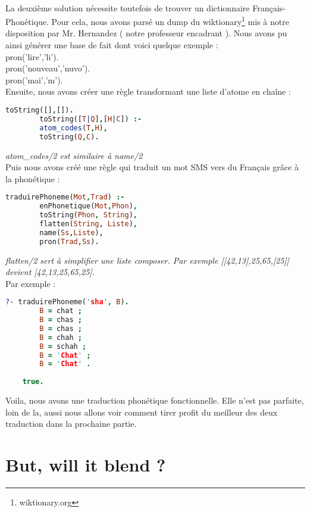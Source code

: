 \documentclass[11pt]{book}
\begin{document}
	\paragraph{}
	La deuxième solution nécessite toutefois de trouver un dictionnaire Français-Phonétique. Pour cela, nous avons parsé un dump du wiktionary\footnote{wiktionary.org} mis à notre disposition par Mr. Hernandez ( notre professeur encadrant ).
	Nous avons pu ainsi générer une base de fait dont voici quelque exemple :\\
	
	\indent pron('lire','li').\\
	\indent pron('nouveau','nuvo').\\
	\indent pron('mai','m').\\
	
	Ensuite, nous avons créer une règle transformant une liste d'atome en chaîne :
	\begin{lstlisting}[language=Prolog]
	toString([],[]).
		toString([T|Q],[H|C]) :-
		atom_codes(T,H),
		toString(Q,C).
	\end{lstlisting}
	
	{\em atom\_codes/2 est similaire à name/2}\\
	
	Puis nous avons créé une règle qui traduit un mot SMS vers du Français grâce à la phonétique :
	\begin{lstlisting}[language=Prolog]
	traduirePhoneme(Mot,Trad) :-
		enPhonetique(Mot,Phon),
		toString(Phon, String),
		flatten(String, Liste),
		name(Ss,Liste),
		pron(Trad,Ss).
	\end{lstlisting}
	
	{\em flatten/2 sert à simplifier une liste composer. Par exemple [[42,13],25,65,[25]] devient [42,13,25,65,25].}\\
	
	Par exemple :
	\begin{lstlisting}[language=Prolog]
	?- traduirePhoneme('sha', B).
		B = chat ;
		B = chas ;
		B = chas ;
		B = chah ;
		B = schah ;
		B = 'Chat' ;
		B = 'Chat' .
		
	true.
	\end{lstlisting}
	
	Voila, nous avons une traduction phonétique fonctionnelle. Elle n'est pas parfaite, loin de la, aussi nous allons voir comment tirer profit du meilleur des deux traduction dans la prochaine partie.
	
	\section{But, will it blend ?}
\end{document}
